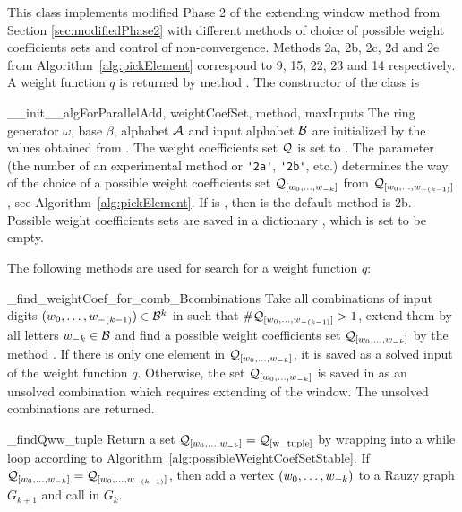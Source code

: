 
This class implements modified Phase 2 of the extending window method from Section \ref{sec:modifiedPhase2} with different methods of choice of possible weight coefficients sets and control of non-convergence. Methods 2a, 2b, 2c, 2d and 2e from Algorithm~\ref{alg:pickElement} correspond to 9, 15, 22, 23 and 14 respectively. A weight function $q$ is returned by method . The constructor of the class is

\begin{method}{\_\_init\_\_}{algForParallelAdd, weightCoefSet, method, maxInputs}
The ring generator $\omega$, base $\beta$, alphabet $\mathcal{A}$ and input alphabet $\mathcal{B}$ are initialized by the values obtained from . The weight coefficients set $\mathcal{Q}$ is set to . The parameter  (the number of an experimental method or \verb+'2a'+, \verb+'2b'+, etc.) determines the way of the choice of a possible weight coefficients set $\mathcal{Q}_{[w_{0}, \dots, w_{-k}]}$ from $\mathcal{Q}_{[w_{0}, \dots, w_{-(k-1)}]}$, see Algorithm~\ref{alg:pickElement}. If  is , then is the default method is 2b. Possible weight coefficients sets  are saved in a dictionary , which is set to be empty.
\end{method}

The following methods are used for search for a weight function $q$:

\begin{method}{\_find\_weightCoef\_for\_comb\_B}{combinations}
Take all combinations of input digits $(w_{0}, \dots, w_{-(k-1)}) \in \mathcal{B}^{k}$ in  such that $\#\mathcal{Q}_{[w_{0}, \dots, w_{-(k-1)}]}>1$, extend them by all letters $w_{-k}\in\mathcal{B}$ and find a possible weight coefficients set $\mathcal{Q}_{[w_{0}, \dots, w_{-k}]}$ by the method . If there is only one element in $\mathcal{Q}_{[w_{0}, \dots, w_{-k}]}$, it is saved as a solved input of the weight function $q$. Otherwise, the set $\mathcal{Q}_{[w_{0}, \dots, w_{-k}]}$ is saved in  as an unsolved combination which requires extending of the window. The unsolved combinations are returned.  
\end{method}

\begin{method}{\_findQw}{w\_tuple}
Return a set $\mathcal{Q}_{[w_{0}, \dots, w_{-k}]}=\mathcal{Q}_{[\text{w\_tuple}]}$ by wrapping  into a while loop according to Algorithm~\ref{alg:possibleWeightCoefSetStable}. If $\mathcal{Q}_{[w_{0}, \dots, w_{-k}]}=\mathcal{Q}_{[w_{0}, \dots, w_{-(k-1)}]}$, then add a vertex $(w_{0}, \dots, w_{-k})$ to a Rauzy graph $G_{k+1}$ and call  in $G_{k}$.
\end{method}

